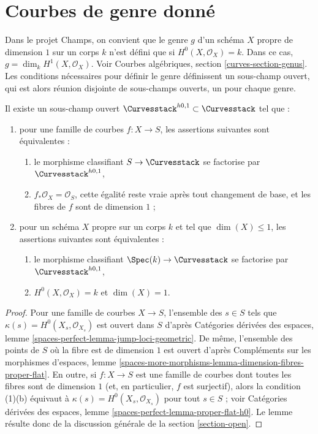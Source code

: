\section{Courbes de genre donné}
\label{section-genus}

\noindent
Dans le projet Champs, on convient que le genre $g$ d'un
schéma $X$ propre de dimension $1$ sur un corps $k$ n'est défini que
si $H^0(X, \mathcal{O}_X) = k$. Dans ce cas,
$g = \dim_k H^1(X, \mathcal{O}_X)$.
Voir Courbes algébriques, section \ref{curves-section-genus}.
Les conditions nécessaires pour définir le genre définissent un sous-champ ouvert,
qui est alors réunion disjointe de sous-champs ouverts, un pour chaque genre.

\begin{lemma}
\label{lemma-pre-genus-curves}
Il existe un sous-champ ouvert $\Curvesstack^{h0, 1} \subset \Curvesstack$
tel que :
\begin{enumerate}
\item pour une famille de courbes $f : X \to S$, les assertions suivantes
sont équivalentes :
\begin{enumerate}
\item le morphisme classifiant $S \to \Curvesstack$ se factorise par
$\Curvesstack^{h0, 1}$,
\item $f_*\mathcal{O}_X = \mathcal{O}_S$, cette égalité reste vraie
après tout changement de base, et les fibres de $f$ sont de dimension $1$ ;
\end{enumerate}
\item pour un schéma $X$ propre sur un corps $k$ et tel que $\dim(X) \leq 1$,
les assertions suivantes sont équivalentes :
\begin{enumerate}
\item le morphisme classifiant $\Spec(k) \to \Curvesstack$ se factorise par
$\Curvesstack^{h0, 1}$,
\item $H^0(X, \mathcal{O}_X) = k$ et $\dim(X) = 1$.
\end{enumerate}
\end{enumerate}
\end{lemma}

\begin{proof}
Pour une famille de courbes $X \to S$, l'ensemble des $s \in S$ tels que
$\kappa(s) = H^0(X_s, \mathcal{O}_{X_s})$
est ouvert dans $S$ d'après Catégories dérivées des espaces, lemme
\ref{spaces-perfect-lemma-jump-loci-geometric}.
De même, l'ensemble des points de $S$ où la fibre est de
dimension $1$ est ouvert d'après Compléments sur les morphismes d'espaces, lemme
\ref{spaces-more-morphisms-lemma-dimension-fibres-proper-flat}.
En outre, si $f : X \to S$ est une famille de courbes dont toutes les fibres
sont de dimension $1$ (et, en particulier, $f$ est surjectif), alors
la condition (1)(b) équivaut à
$\kappa(s) = H^0(X_s, \mathcal{O}_{X_s})$ pour tout $s \in S$ ; voir
Catégories dérivées des espaces, lemme \ref{spaces-perfect-lemma-proper-flat-h0}.
Le lemme résulte donc de la discussion générale de la
section \ref{section-open}.
\end{proof}

